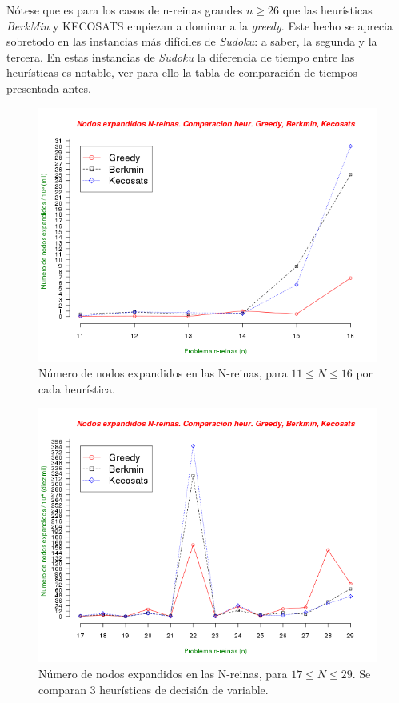 \documentclass[12pt,lettersize,oneside]{article}
\begin{document}
Nótese que es para los casos de n-reinas grandes $n\geq 26$ que las heurísticas \emph{BerkMin} y KECOSATS empiezan a dominar a la \emph{greedy}. Este hecho se aprecia sobretodo en las instancias más difíciles de \emph{Sudoku}: a saber, la segunda y la tercera. En estas instancias de \emph{Sudoku} la diferencia de tiempo entre las heurísticas es notable, ver para ello la tabla de comparación de tiempos presentada antes.
\begin{figure}[!ht]\caption{Número de nodos expandidos en las N-reinas, para $11\leq
    N \leq 16$ por cada heurística.}
\label{NodosExpandidosReinasGrd}
\includegraphics[scale=0.57]{reinas2Ver3.png}
\end{figure}

\begin{figure}[!ht]\caption{Número de nodos expandidos en las N-reinas, para $17\leq
    N \leq 29$. Se comparan 3 heurísticas de decisión de variable.}
\label{NodosExpandidosReinasGrd}
\includegraphics[scale=0.82,angle=90]{reinas3Ver3.png}
\end{figure}
\end{document}
